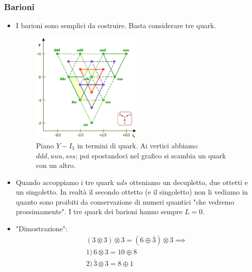 \subsubsection{Barioni}
\begin{itemize}
\item I barioni sono semplici da costruire. Basta considerare tre quark. 
\begin{figure}[H]
    \centering
    \includegraphics[width=0.5\textwidth]{immagini/fig_baryon_quarks.png}
    \caption{Piano $Y-I_3$ in termini di quark. Ai vertici abbiamo $ddd,uuu,sss$; poi spostandoci nel grafico si scambia un quark con un altro.}
\end{figure}
\item Quando accoppiamo i tre quark $uds$ otteniamo un decupletto, due ottetti e un singoletto. In realtà il secondo ottetto (e il singoletto) non li vediamo in quanto sono proibiti da conservazione di numeri quantici "che vedremo prossimamente". I tre quark dei barioni hanno sempre $L=0$.
\item "Dimostrazione":
\begin{gather*}
(3\otimes3)\otimes3=(6\oplus\bar3)\otimes3\implies\\
1)\,6\otimes3=10\oplus8\\
2)\,\bar3\otimes3=8\oplus1
\end{gather*}
\end{itemize}
